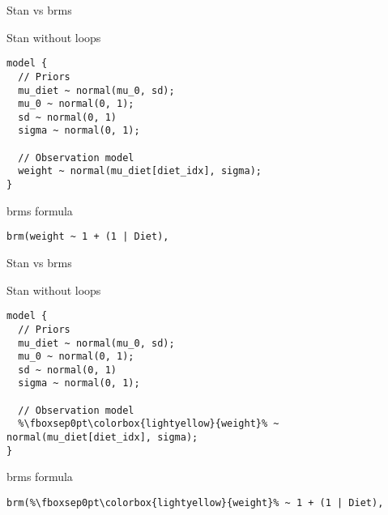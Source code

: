 \documentclass[finnish,english,t]{beamer}
\begin{document}
\begin{frame}[fragile]{Stan vs brms}

  \vspace{-0.5\baselineskip}

  Stan without loops
  
{\small
\begin{verbatim}
model {
  // Priors
  mu_diet ~ normal(mu_0, sd);
  mu_0 ~ normal(0, 1);
  sd ~ normal(0, 1)
  sigma ~ normal(0, 1);
  
  // Observation model
  weight ~ normal(mu_diet[diet_idx], sigma);
}
\end{verbatim}

  brms formula
\begin{verbatim}  
brm(weight ~ 1 + (1 | Diet),
\end{verbatim}
}

\end{frame}

\begin{frame}[fragile]{Stan vs brms}

  \vspace{-0.5\baselineskip}

  Stan without loops
  
{\small
\begin{verbatim}
model {
  // Priors
  mu_diet ~ normal(mu_0, sd);
  mu_0 ~ normal(0, 1);
  sd ~ normal(0, 1)
  sigma ~ normal(0, 1);
  
  // Observation model
  %\fboxsep0pt\colorbox{lightyellow}{weight}% ~ normal(mu_diet[diet_idx], sigma);
}
\end{verbatim}

  brms formula
\begin{verbatim}  
brm(%\fboxsep0pt\colorbox{lightyellow}{weight}% ~ 1 + (1 | Diet),
\end{verbatim}
}

\end{frame}
\end{document}
